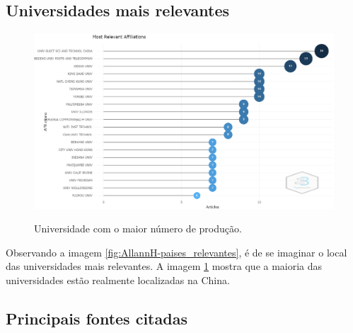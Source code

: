 \subsection{Universidades mais relevantes}

\begin{figure}
    \centering
    \caption{Universidade com o maior número de produção.}
    \includegraphics[width=1\textwidth]{experiments/AllannH/PesquisaBibliometrica/Imagens/TSW-AllannH-universidades_relevantes.png}
    \label{fig:AllannH-uni_relevantes}
\end{figure}
Observando a imagem \ref{fig:AllannH-paises_relevantes}, é de se imaginar o local das universidades mais relevantes. A imagem \ref{fig:AllannH-uni_relevantes} mostra que a maioria das universidades estão realmente localizadas na China.

\subsection{Principais fontes citadas}

